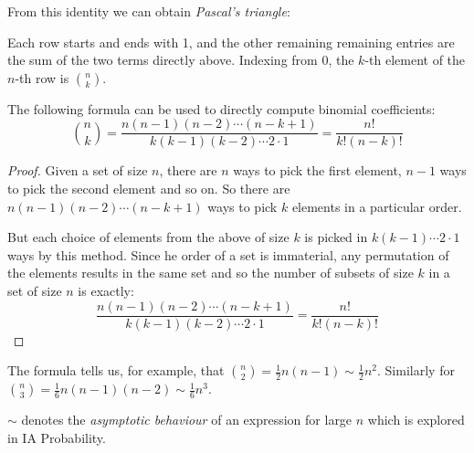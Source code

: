 \documentclass[../main.tex]{subfiles}
\begin{document}
From this identity we can obtain \textit{Pascal's triangle}:
\begin{center}
\end{center}
Each row starts and ends with 1, and the other remaining remaining entries are the sum of the two terms directly above.
Indexing from 0, the $k$-th element of the $n$-th row is $\binom{n}{k}$.
\begin{proposition}
  The following formula can be used to directly compute binomial coefficients:
  \[
    \binom{n}{k} = \frac{n(n-1)(n-2)\cdots(n-k+1)}{k(k-1)(k-2)\cdots2\cdot1} = \frac{n!}{k!(n - k)!}
  \]
\end{proposition}
\begin{proof}
  Given a set of size $n$, there are $n$ ways to pick the first element, $n - 1$ ways to pick the second element and so on.
  So there are $n(n-1)(n-2)\cdots(n-k + 1)$ ways to pick $k$ elements in a particular order.

  But each choice of elements from the above of size $k$ is picked in $k(k - 1) \cdots 2 \cdot 1$ ways by this method.
  Since he order of a set is immaterial, any permutation of the elements results in the same set and so the number of subsets of size $k$ in a set of size $n$ is exactly:
  \[
    \frac{n(n-1)(n-2)\cdots(n-k+1)}{k(k-1)(k-2)\cdots2\cdot1} = \frac{n!}{k!(n - k)!}
  \]
\end{proof}
\begin{remark}[Note]
  The formula tells us, for example, that $\binom{n}{2} = \frac{1}{2}n(n-1) \sim \frac{1}{2}n^2$.
  Similarly for $\binom{n}{3} = \frac{1}{6}n(n-1)(n-2) \sim \frac{1}{6}n^3$.
\end{remark}
\begin{remark}[Notation]
  $\sim$ denotes the \textit{asymptotic behaviour} of an expression for large $n$ which is explored in IA Probability.
\end{remark}
\end{document}
